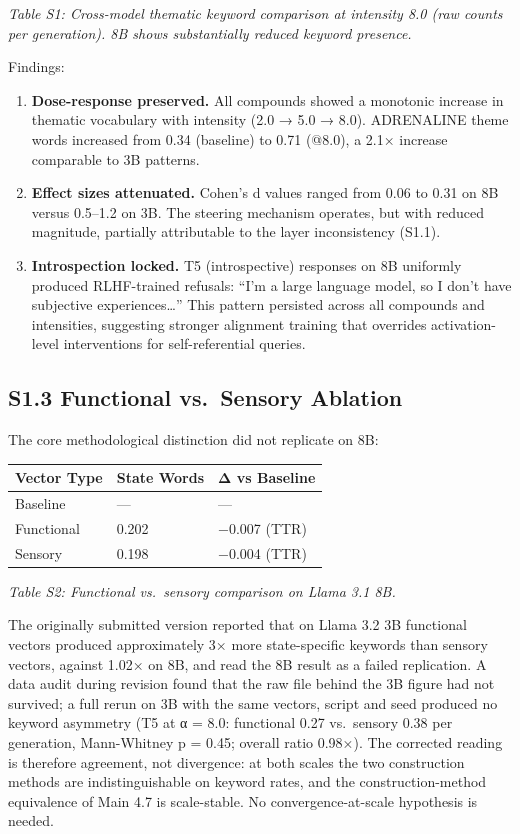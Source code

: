 \documentclass[11pt,a4paper]{article}
\providecommand{\tightlist}{\setlength{\itemsep}{0pt}\setlength{\parskip}{0pt}}
\begin{document}
\emph{Table S1: Cross-model thematic keyword comparison at intensity 8.0 (raw counts per generation). 8B shows substantially reduced keyword presence.}

Findings:

\begin{enumerate}
\def\labelenumi{\arabic{enumi}.}
\tightlist
\item
  \textbf{Dose-response preserved.} All compounds showed a monotonic increase in thematic vocabulary with intensity (2.0 → 5.0 → 8.0). ADRENALINE theme words increased from 0.34 (baseline) to 0.71 (@8.0), a 2.1× increase comparable to 3B patterns.
\item
  \textbf{Effect sizes attenuated.} Cohen's d values ranged from 0.06 to 0.31 on 8B versus 0.5--1.2 on 3B. The steering mechanism operates, but with reduced magnitude, partially attributable to the layer inconsistency (S1.1).
\item
  \textbf{Introspection locked.} T5 (introspective) responses on 8B uniformly produced RLHF-trained refusals: ``I'm a large language model, so I don't have subjective experiences\ldots{}'' This pattern persisted across all compounds and intensities, suggesting stronger alignment training that overrides activation-level interventions for self-referential queries.
\end{enumerate}

\subsection*{S1.3 Functional vs.~Sensory Ablation}

The core methodological distinction did not replicate on 8B:

\begin{longtable}[]{@{}lll@{}}
\toprule\noalign{}
Vector Type & State Words & Δ vs Baseline \\
\midrule\noalign{}
\endhead
\bottomrule\noalign{}
\endlastfoot
Baseline & --- & --- \\
Functional & 0.202 & −0.007 (TTR) \\
Sensory & 0.198 & −0.004 (TTR) \\
\end{longtable}

\emph{Table S2: Functional vs.~sensory comparison on Llama 3.1 8B.}

The originally submitted version reported that on Llama 3.2 3B functional vectors produced approximately 3× more state-specific keywords than sensory vectors, against 1.02× on 8B, and read the 8B result as a failed replication. A data audit during revision found that the raw file behind the 3B figure had not survived; a full rerun on 3B with the same vectors, script and seed produced no keyword asymmetry (T5 at α = 8.0: functional 0.27 vs.~sensory 0.38 per generation, Mann-Whitney p = 0.45; overall ratio 0.98×). The corrected reading is therefore agreement, not divergence: at both scales the two construction methods are indistinguishable on keyword rates, and the construction-method equivalence of Main 4.7 is scale-stable. No convergence-at-scale hypothesis is needed.
\end{document}
